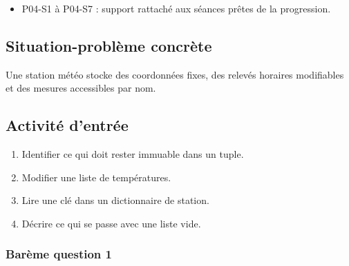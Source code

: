 \begin{itemize}
\tightlist
\item
  P04-S1 à P04-S7 : support rattaché aux séances prêtes de la
  progression.
\end{itemize}

\subsection{Situation-problème concrète}

Une station météo stocke des coordonnées fixes, des relevés horaires
modifiables et des mesures accessibles par nom.

\subsection{Activité d’entrée}

\begin{enumerate}
\def\labelenumi{\arabic{enumi}.}
\tightlist
\item
  Identifier ce qui doit rester immuable dans un tuple.
\item
  Modifier une liste de températures.
\item
  Lire une clé dans un dictionnaire de station.
\item
  Décrire ce qui se passe avec une liste vide.
\end{enumerate}

\subsubsection{Barème question 1}

